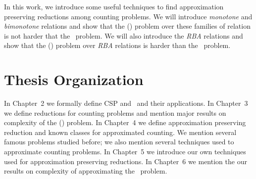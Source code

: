 In this work, we introduce some useful techniques to find approximation preserving reductions
among counting problems. We will introduce \emph{monotone} and \emph{bimonotone} relations
and show that the \ccsp(\mrelset) problem over these families of relation is not harder that
the \cbis\ problem. We will also introduce the \emph{RBA} relations and
show that the \ccsp(\mrelset) problem over \emph{RBA} relations is harder than the \cbis\ problem.

\section{Thesis Organization}
In Chapter~2 we formally define CSP and \ccsp\ and their applications.
In Chapter~3 we define reductions for counting problems and mention major results
on complexity of the \ccsp(\mrelset) problem. In Chapter~4 we define approximation preserving
reduction and known classes for approximated counting. We mention several famous problems studied before;
we also mention several techniques used to approximate counting problems.
In Chapter~5 we introduce our own techniques used for approximation preserving reductions.
In Chapter~6 we mention the our results on complexity of approximating the \cbis\ problem.
